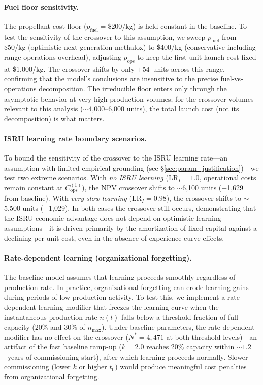 \documentclass[preprint,12pt]{elsarticle}
\begin{document}
\paragraph{Fuel floor sensitivity.} The propellant cost floor ($p_{\mathrm{fuel}} = \$200$/kg) is held constant in the baseline. To test the sensitivity of the crossover to this assumption, we sweep $p_{\mathrm{fuel}}$ from \$50/kg (optimistic next-generation methalox) to \$400/kg (conservative including range operations overhead), adjusting $p_{\mathrm{ops}}$ to keep the first-unit launch cost fixed at \$1{,}000/kg. The crossover shifts by only $\pm$54~units across this range, confirming that the model's conclusions are insensitive to the precise fuel-vs-operations decomposition. The irreducible floor enters only through the asymptotic behavior at very high production volumes; for the crossover volumes relevant to this analysis ($\sim$4{,}000--6{,}000 units), the total launch cost (not its decomposition) is what matters.

\paragraph{ISRU learning rate boundary scenarios.} To bound the sensitivity of the crossover to the ISRU learning rate---an assumption with limited empirical grounding (see \S\ref{sec:param_justification})---we test two extreme scenarios. With \emph{no ISRU learning} ($\mathrm{LR}_I = 1.0$, operational costs remain constant at $C_{\mathrm{ops}}^{(1)}$), the NPV crossover shifts to $\sim$6{,}100 units ($+$1{,}629 from baseline). With \emph{very slow learning} ($\mathrm{LR}_I = 0.98$), the crossover shifts to $\sim$5{,}500 units ($+$1{,}029). In both cases the crossover still occurs, demonstrating that the ISRU economic advantage does not depend on optimistic learning assumptions---it is driven primarily by the amortization of fixed capital against a declining per-unit cost, even in the absence of experience-curve effects.

\paragraph{Rate-dependent learning (organizational forgetting).} The baseline model assumes that learning proceeds smoothly regardless of production rate. In practice, organizational forgetting \cite{benkard2000,thompson2012} can erode learning gains during periods of low production activity. To test this, we implement a rate-dependent learning modifier that freezes the learning curve when the instantaneous production rate $\dot{n}(t)$ falls below a threshold fraction of full capacity (20\% and 30\% of $\dot{n}_{\max}$). Under baseline parameters, the rate-dependent modifier has no effect on the crossover ($N^* = 4{,}471$ at both threshold levels)---an artifact of the fast baseline ramp-up ($k = 2.0$ reaches 20\% capacity within ${\sim}1.2$~years of commissioning start), after which learning proceeds normally. Slower commissioning (lower $k$ or higher $t_0$) would produce meaningful cost penalties from organizational forgetting.
\end{document}
